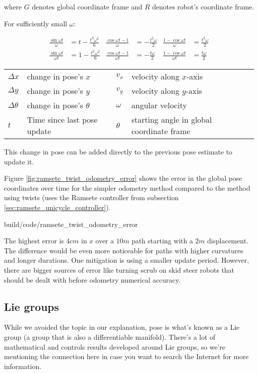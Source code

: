 \begin{theorem}
  where $G$ denotes global coordinate frame and $R$ denotes robot's coordinate
  frame.

  For sufficiently small $\omega$:

  \begin{align}
    \frac{\sin\omega t}{\omega} &= t - \frac{t^3 \omega^2}{6} &
    \frac{\cos\omega t - 1}{\omega} &= -\frac{t^2 \omega}{2} &
    \frac{1 - \cos\omega t}{\omega} &= \frac{t^2 \omega}{2} \\
    \frac{\sin\omega t}{\omega t} &= 1 - \frac{t^2 \omega^2}{6} &
    \frac{\cos\omega t - 1}{\omega t} &= -\frac{t \omega}{2} &
    \frac{1 - \cos\omega t}{\omega t} &= \frac{t \omega}{2}
  \end{align}

  \begin{figurekey}
    \begin{tabular}{llll}
      $\Delta x$ & change in pose's $x$ & $v_x$ & velocity along $x$-axis \\
      $\Delta y$ & change in pose's $y$ & $v_y$ & velocity along $y$-axis \\
      $\Delta \theta$ & change in pose's $\theta$ & $\omega$ & angular velocity
        \\
      $t$ & Time since last pose update & $\theta$ & starting angle in global
        coordinate frame
    \end{tabular}
  \end{figurekey}

  This change in pose can be added directly to the previous pose estimate to
  update it.
\end{theorem}

Figure \ref{fig:ramsete_twist_odometry_error} shows the error in the global pose
coordinates over time for the simpler odometry method compared to the method
using twists (uses the Ramsete controller from subsection
\ref{sec:ramsete_unicycle_controller}).

\begin{svg}{build/code/ramsete_twist_odometry_error}
  \caption{Odometry error compared to method using twists ($dt = 0.05s$)}
  \label{fig:ramsete_twist_odometry_error}
\end{svg}

The highest error is $4cm$ in $x$ over a $10m$ path starting with a $2m$
displacement. The difference would be even more noticeable for paths with higher
curvatures and longer durations. One mitigation is using a smaller update
period. However, there are bigger sources of error like turning scrub on skid
steer robots that should be dealt with before odometry numerical accuracy.

\subsection{Lie groups}

While we avoided the topic in our explanation, pose is what's known as a Lie
group (a group that is also a differentiable manifold). There's a lot of
mathematical and controls results  developed around Lie groups, so we're
mentioning the connection here in case you want to search the Internet for more
information.
